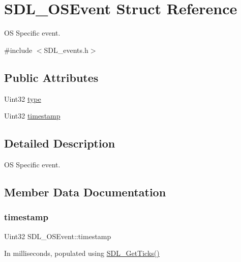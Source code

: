 \hypertarget{struct_s_d_l___o_s_event}{}\section{S\+D\+L\+\_\+\+O\+S\+Event Struct Reference}
\label{struct_s_d_l___o_s_event}


OS Specific event.  




{\ttfamily \#include $<$S\+D\+L\+\_\+events.\+h$>$}

\subsection*{Public Attributes}
\begin{DoxyCompactItemize}
\item 
Uint32 \mbox{\hyperlink{struct_s_d_l___o_s_event_a85a600619ebebc8db007fc757b3895a5}{type}}
\item 
Uint32 \mbox{\hyperlink{struct_s_d_l___o_s_event_a8b2480eefadad9f3f8c94f8e550b7fb0}{timestamp}}
\end{DoxyCompactItemize}


\subsection{Detailed Description}
OS Specific event. 

\subsection{Member Data Documentation}
\mbox{\label{struct_s_d_l___o_s_event_a8b2480eefadad9f3f8c94f8e550b7fb0}} 
\subsubsection{\texorpdfstring{timestamp}{timestamp}}
{\footnotesize\ttfamily Uint32 S\+D\+L\+\_\+\+O\+S\+Event\+::timestamp}

In milliseconds, populated using \mbox{\hyperlink{_s_d_l__timer_8h_a0b9bc71d6287e0ffafdc3419760fe2b3}{S\+D\+L\+\_\+\+Get\+Ticks()}} \mbox{\label{struct_s_d_l___o_s_event_a85a600619ebebc8db007fc757b3895a5}} 
